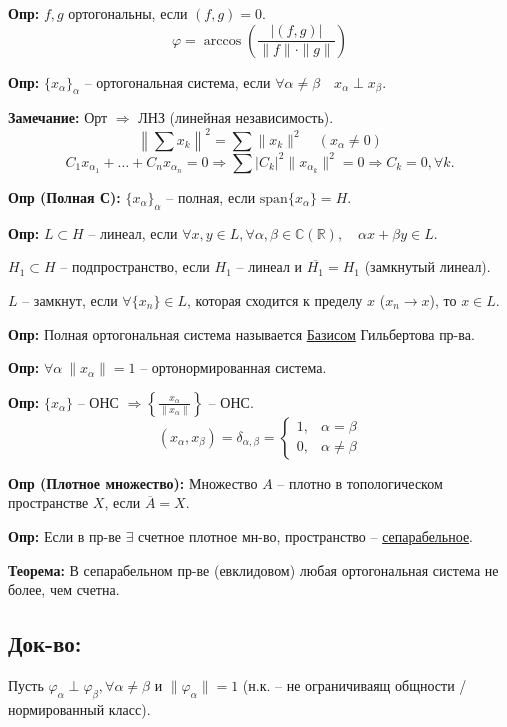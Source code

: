 \documentclass[12pt,a4paper,openany]{book}
\begin{document}
\textbf{Опр:} $f, g$ ортогональны, если $(f, g) = 0$.
\[
\varphi = \arccos \left( \frac{|(f, g)|}{\|f\| \cdot \|g\|} \right)
\]

\textbf{Опр:} $\{x_\alpha\}_\alpha$ -- ортогональная система, если $\forall \alpha \neq \beta \quad x_\alpha \perp x_\beta$.

\textbf{Замечание:}
Орт $\Rightarrow$ ЛНЗ (линейная независимость).
\[
\left\| \sum x_k \right\|^2 = \sum \|x_k\|^2 \quad (x_\alpha \neq 0)
\]
\[
C_1 x_{\alpha_1} + \dots + C_n x_{\alpha_n} = 0 \Rightarrow \sum |C_k|^2 \|x_{\alpha_k}\|^2 = 0 \Rightarrow C_k = 0, \forall k.
\]

\textbf{Опр (Полная С):}
$\{x_\alpha\}_\alpha$ -- полная, если $\text{span}\{x_\alpha\} = H$.

\textbf{Опр:} $L \subset H$ -- линеал, если $\forall x, y \in L, \forall \alpha, \beta \in \mathbb{C} (\mathbb{R}), \quad \alpha x + \beta y \in L$.

$H_1 \subset H$ -- подпространство, если $H_1$ -- линеал и $\overline{H_1} = H_1$ (замкнутый линеал).

$L$ -- замкнут, если $\forall \{x_n\} \in L$, которая сходится к пределу $x$ ($x_n \to x$), то $x \in L$.

\textbf{Опр:} Полная ортогональная система называется \underline{Базисом} Гильбертова пр-ва.

\textbf{Опр:} $\forall \alpha \ \|x_\alpha\| = 1$ -- ортонормированная система.

\textbf{Опр:} $\{x_\alpha\}$ -- ОНС $\Rightarrow \left\{ \frac{x_\alpha}{\|x_\alpha\|} \right\}$ -- ОНС.
\[
(x_\alpha, x_\beta) = \delta_{\alpha, \beta} = 
\begin{cases} 
1, & \alpha = \beta \\ 
0, & \alpha \neq \beta 
\end{cases}
\]

\textbf{Опр (Плотное множество):}
Множество $A$ -- плотно в топологическом пространстве $X$, если $\overline{A} = X$.

\textbf{Опр:} Если в пр-ве $\exists$ счетное плотное мн-во, пространство -- \underline{сепарабельное}.

\textbf{Теорема:} В сепарабельном пр-ве (евклидовом) любая ортогональная система не более, чем счетна.

\subsection{Док-во:}

Пусть $\varphi_\alpha \perp \varphi_\beta, \forall \alpha \neq \beta$ и $\|\varphi_\alpha\| = 1$ (н.к. -- не ограничиваящ общности / нормированный класс).
\end{document}
